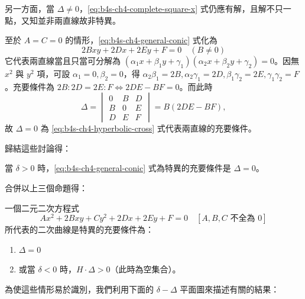 另一方面，當 $\Delta \ne 0$，\eqref{eq:b4s-ch4-complete-square-x} 式仍應有解，且解不只一點，又知並非兩直線故非特異。

至於 $A = C = 0$ 的情形，\eqref{eq:b4s-ch4-general-conic} 式化為
\begin{equation}
2Bxy + 2Dx + 2Ey + F = 0 \quad (B \ne 0)
\label{eq:b4s-ch4-hyperbolic-cross}
\end{equation}
它代表兩直線當且只當可分解為 $(\alpha_1 x + \beta_1 y + \gamma_1)(\alpha_2 x + \beta_2 y + \gamma_2) = 0$。因無 $x^2$ 與 $y^2$ 項，可設 $\alpha_1 = 0, \beta_2 = 0$，得 $\alpha_2 \beta_1 = 2B, \alpha_2 \gamma_1 = 2D, \beta_1 \gamma_2 = 2E, \gamma_1 \gamma_2 = F$。充要條件為 $2B : 2D = 2E : F \iff 2DE - BF = 0$。而此時
\[
\Delta = \begin{vmatrix} 0 & B & D \\ B & 0 & E \\ D & E & F \end{vmatrix} = B(2DE - BF),
\]
故 $\Delta = 0$ 為 \eqref{eq:b4s-ch4-hyperbolic-cross} 式代表兩直線的充要條件。

歸結這些討論得：
\begin{proposition}
當 $\delta > 0$ 時，\eqref{eq:b4s-ch4-general-conic} 式為特異的充要條件是 $\Delta = 0$。
\end{proposition}

合併以上三個命題得：

\begin{theorem}[特異二次曲線判別定理]
一個二元二次方程式
\[
Ax^2 + 2Bxy + Cy^2 + 2Dx + 2Ey + F = 0 \quad [A, B, C \text{ 不全為 } 0]
\]
所代表的二次曲線是特異的充要條件為：
\begin{enumerate}[(1)]
  \item $\Delta = 0$
  \item 或當 $\delta < 0$ 時，$H \cdot \Delta > 0$（此時為空集合）。
\end{enumerate}
\end{theorem}

為使這些情形易於識別，我們利用下面的 $\delta-\Delta$ 平面圖來描述有關的結果：

